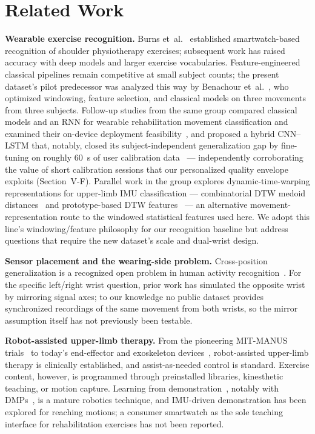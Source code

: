 \documentclass[conference]{IEEEtran}
\begin{document}
\section{Related Work}
\textbf{Wearable exercise recognition.} Burns
et~al.~\cite{burns2018} established smartwatch-based recognition of
shoulder physiotherapy exercises; subsequent work has raised accuracy
with deep models and larger exercise vocabularies. Feature-engineered
classical pipelines remain competitive at small subject counts; the
present dataset's pilot predecessor was analyzed this way by Benachour
et~al.~\cite{benachour2025}, who optimized windowing, feature
selection, and classical models on three movements from three
subjects. Follow-up studies from the same group compared classical
models and an RNN for wearable rehabilitation movement classification
and examined their on-device deployment feasibility~\cite{araya2025},
and proposed a hybrid CNN--LSTM that, notably, closed its
subject-independent generalization gap by fine-tuning on roughly 60~s
of user calibration data~\cite{eshetu2026} --- independently
corroborating the value of short calibration sessions that our
personalized quality envelope exploits (Section~V-F). Parallel work in
the group explores dynamic-time-warping representations for upper-limb
IMU classification --- combinatorial DTW medoid
distances~\cite{kedir2026} and prototype-based DTW
features~\cite{bona2026} --- an alternative movement-representation
route to the windowed statistical features used here. We adopt this
line's windowing/feature philosophy for our recognition baseline but
address questions that require the new dataset's scale and dual-wrist
design.

\textbf{Sensor placement and the wearing-side problem.} Cross-position
generalization is a recognized open problem in human activity
recognition~\cite{bulling2014}. For the specific left/right wrist
question, prior work has simulated the opposite wrist by mirroring
signal axes; to our knowledge no public dataset provides synchronized
recordings of the same movement from both wrists, so the mirror
assumption itself has not previously been testable.

\textbf{Robot-assisted upper-limb therapy.} From the pioneering
MIT-MANUS trials~\cite{krebs1998} to today's end-effector and
exoskeleton devices~\cite{maciejasz2014}, robot-assisted upper-limb
therapy is clinically established, and assist-as-needed control is
standard. Exercise content, however, is programmed through
preinstalled libraries, kinesthetic teaching, or motion capture.
Learning from demonstration~\cite{argall2009}, notably with
DMPs~\cite{ijspeert2013}, is a mature robotics technique, and
IMU-driven demonstration has been explored for reaching motions; a
consumer smartwatch as the sole teaching interface for rehabilitation
exercises has not been reported.
\end{document}
